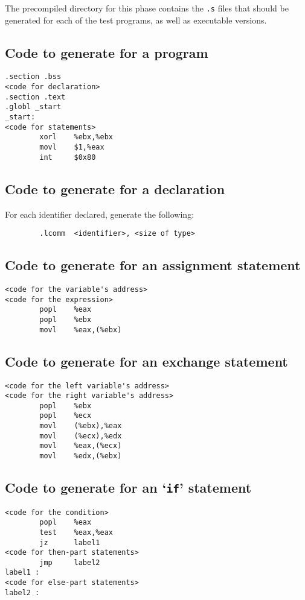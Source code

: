 \documentclass{article}
\begin{document}
The precompiled directory for this phase contains the \texttt{.s}
files that should be generated for each of the test programs, as well
as executable versions.

\subsection*{Code to generate for a program}
\begin{verbatim}
.section .bss
<code for declaration>
.section .text
.globl _start
_start:
<code for statements>
        xorl    %ebx,%ebx
        movl    $1,%eax
        int     $0x80
\end{verbatim}

\subsection*{Code to generate for a declaration}
For each identifier declared, generate the following:
\begin{verbatim}
        .lcomm  <identifier>, <size of type>
\end{verbatim}

\subsection*{Code to generate for an assignment statement}
\begin{verbatim}
<code for the variable's address>
<code for the expression>
        popl    %eax
        popl    %ebx
        movl    %eax,(%ebx)
\end{verbatim}

\subsection*{Code to generate for an exchange statement}
\begin{verbatim}
<code for the left variable's address>
<code for the right variable's address>
        popl    %ebx
        popl    %ecx
        movl    (%ebx),%eax
        movl    (%ecx),%edx
        movl    %eax,(%ecx)
        movl    %edx,(%ebx)
\end{verbatim}

\subsection*{Code to generate for an `\texttt{if}' statement}
\begin{verbatim}
<code for the condition>
        popl    %eax
        test    %eax,%eax
        jz      label1
<code for then-part statements>
        jmp     label2
label1 :
<code for else-part statements>
label2 :
\end{verbatim}
\end{document}
